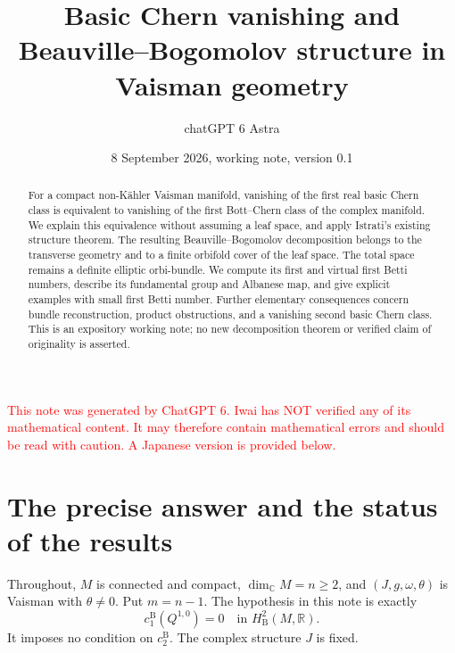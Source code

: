 \documentclass[12pt]{amsart}
\makeatletter
\theoremstyle{definition}
\theoremstyle{remark}
\numberwithin{equation}{section}
\newcommand{\R}{\mathbb{R}}
\newcommand{\C}{\mathbb{C}}
\newcommand{\xr}[1]{\textcolor{red}{#1}}
\newcommand{\bas}{\mathrm{B}}
\let\MergeSetAbstract\@setabstract
\let\MergeSectionNumber\thesection
\let\MergeSectionName\sectionname
\let\MergeHSection\theHsection
\let\MergeChapterApp\Hy@chapapp
\newcommand{\MergeLanguage}{en}
\renewcommand*{\HyperDestNameFilter}[1]{\MergeLanguage.#1}
\renewcommand*{\pdfbookmark}[3][0]{%
  \bookmark[level=#1,dest={\HyperDestNameFilter{#3.#1}}]{#2}%
  \hyper@anchorstart{#3.#1}\hyper@anchorend}
\def\MergeResetCounters{}%
\newcommand{\MergeStart}[1]{%
  \def\MergeLanguage{#1}%
  \MergeResetCounters
  \let\thesection\MergeSectionNumber
  \let\sectionname\MergeSectionName
  \let\theHsection\MergeHSection
  \global\let\Hy@chapapp\MergeChapterApp
  \global\let\@setabstract\MergeSetAbstract
  \global\let\authors\@empty
  \gdef\shortauthors{chatGPT 6 Astra}%
  \global\let\addresses\@empty
}
\makeatother
\begin{document}
\begingroup
\MergeStart{en}
\title[Basic Chern vanishing on Vaisman manifolds]{Basic Chern vanishing and Beauville--Bogomolov structure in Vaisman geometry}
\author{chatGPT 6 Astra}







\date{8 September 2026, working note, version 0.1}
\renewcommand{\subjclassname}{\textup{2020} Mathematics Subject Classification}


\pdfbookmark[0]{English version}{language-en}

\begin{abstract}
For a compact non-K\"ahler Vaisman manifold, vanishing of the first real
basic Chern class is equivalent to vanishing of the first Bott--Chern class
of the complex manifold. We explain this equivalence without assuming a
leaf space, and apply Istrati's existing structure theorem. The resulting
Beauville--Bogomolov decomposition belongs to the transverse geometry and
to a finite orbifold cover of the leaf space. The total space remains a
definite elliptic orbi-bundle. We compute its first and virtual first Betti
numbers, describe its fundamental group and Albanese map, and give explicit
examples with small first Betti number. Further elementary consequences
concern bundle reconstruction, product obstructions, and a vanishing second
basic Chern class. This is an expository working note; no new decomposition
theorem or verified claim of originality is asserted.
\end{abstract}
\maketitle
\xr{This note was generated by ChatGPT 6. Iwai has NOT verified any of its mathematical content. It may therefore contain mathematical errors and should be read with caution. A Japanese version is provided below.}
\tableofcontents

\section{The precise answer and the status of the results}
\label{sec:intro}
Throughout, $M$ is connected and compact, $\dim_{\C}M=n\geq2$, and
$(J,g,\omega,\theta)$ is Vaisman with $\theta\ne0$. Put $m=n-1$.
The hypothesis in this note is exactly
\begin{equation}\label{eq:hyp}
c_1^{\bas}(Q^{1,0})=0\quad\text{in }H^2_{\bas}(M,\R).
\end{equation}
It imposes no condition on $c_2^{\bas}$. The complex structure $J$ is fixed.
\end{document}
